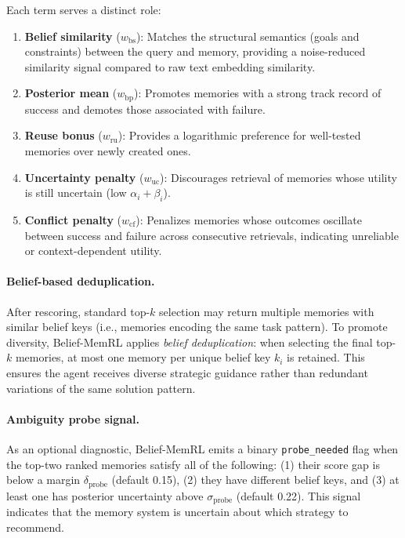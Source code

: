 Each term serves a distinct role:
\begin{enumerate}
  \item \textbf{Belief similarity} ($w_{\mathrm{bs}}$): Matches the structural semantics (goals and constraints) between the query and memory, providing a noise-reduced similarity signal compared to raw text embedding similarity.
  \item \textbf{Posterior mean} ($w_{\mathrm{bp}}$): Promotes memories with a strong track record of success and demotes those associated with failure.
  \item \textbf{Reuse bonus} ($w_{\mathrm{ru}}$): Provides a logarithmic preference for well-tested memories over newly created ones.
  \item \textbf{Uncertainty penalty} ($w_{\mathrm{uc}}$): Discourages retrieval of memories whose utility is still uncertain (low $\alpha_i + \beta_i$).
  \item \textbf{Conflict penalty} ($w_{\mathrm{cf}}$): Penalizes memories whose outcomes oscillate between success and failure across consecutive retrievals, indicating unreliable or context-dependent utility.
\end{enumerate}

\paragraph{Belief-based deduplication.}
After rescoring, standard top-$k$ selection may return multiple memories with similar belief keys (i.e., memories encoding the same task pattern). To promote diversity, Belief-MemRL applies \emph{belief deduplication}: when selecting the final top-$k$ memories, at most one memory per unique belief key $k_i$ is retained. This ensures the agent receives diverse strategic guidance rather than redundant variations of the same solution pattern.

\paragraph{Ambiguity probe signal.}
As an optional diagnostic, Belief-MemRL emits a binary \texttt{probe\_needed} flag when the top-two ranked memories satisfy all of the following: (1) their score gap is below a margin $\delta_{\mathrm{probe}}$ (default 0.15), (2) they have different belief keys, and (3) at least one has posterior uncertainty above $\sigma_{\mathrm{probe}}$ (default 0.22). This signal indicates that the memory system is uncertain about which strategy to recommend.

